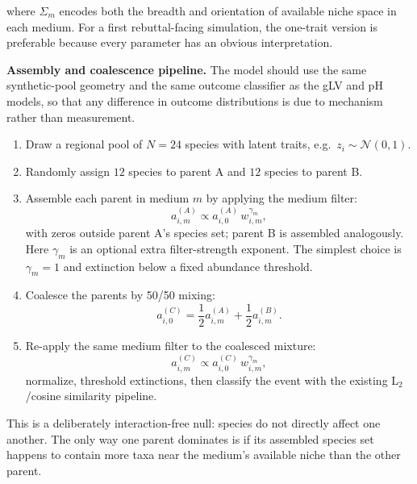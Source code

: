 \documentclass[11pt]{article}
\begin{document}
\noindent where $\Sigma_m$ encodes both the breadth and orientation of available niche space in each medium. For a first rebuttal-facing simulation, the one-trait version is preferable because every parameter has an obvious interpretation.

\noindent\textbf{Assembly and coalescence pipeline.}
The model should use the same synthetic-pool geometry and the same outcome classifier as the gLV and pH models, so that any difference in outcome distributions is due to mechanism rather than measurement.

\begin{enumerate}[itemsep=2pt]
    \item Draw a regional pool of $N=24$ species with latent traits, e.g.\ $z_i \sim \mathcal{N}(0,1)$.
    \item Randomly assign $12$ species to parent A and $12$ species to parent B.
    \item Assemble each parent in medium $m$ by applying the medium filter:
    \begin{equation*}
        a_{i,m}^{(A)}
        \propto
        a_{i,0}^{(A)}\, w_{i,m}^{\gamma_m},
    \end{equation*}
    with zeros outside parent A's species set; parent B is assembled analogously. Here $\gamma_m$ is an optional extra filter-strength exponent. The simplest choice is $\gamma_m=1$ and extinction below a fixed abundance threshold.
    \item Coalesce the parents by 50/50 mixing:
    \begin{equation*}
        a_{i,0}^{(C)}
        =
        \frac{1}{2} a_{i,m}^{(A)}
        +
        \frac{1}{2} a_{i,m}^{(B)}.
    \end{equation*}
    \item Re-apply the same medium filter to the coalesced mixture:
    \begin{equation*}
        a_{i,m}^{(C)}
        \propto
        a_{i,0}^{(C)}\, w_{i,m}^{\gamma_m},
    \end{equation*}
    normalize, threshold extinctions, then classify the event with the existing L$_2$/cosine similarity pipeline.
\end{enumerate}

\noindent This is a deliberately interaction-free null: species do not directly affect one another. The only way one parent dominates is if its assembled species set happens to contain more taxa near the medium's available niche than the other parent.
\end{document}
